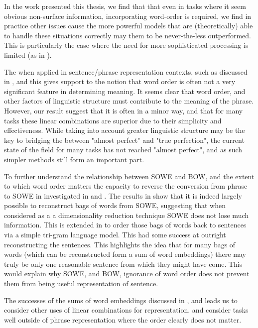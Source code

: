 \documentclass{book}
\begin{document}
In the work presented this thesis, 
we find that that even in tasks where it seem obvious non-surface information, incorporating word-order is required,
we find in practice other issues cause the more powerful models that are (theoretically) able to handle these situations correctly may them to be never-the-less outperformed.
This is particularly the case where the need for more sophisticated processing is limited (as in ).






The when applied in sentence/phrase representation contexts,
such as discussed in , and 
this gives support to the notion that word order is often not a very significant feature in determining meaning.
It seems clear that word order, and other factors of linguistic structure must contribute to the meaning of the phrase.
However, our result suggest that it is often in a minor way, and that for many tasks these linear combinations are superior due to their simplicity and effectiveness.
While taking into account greater linguistic structure may be the key to bridging the between "almost perfect" and "true perfection", the current state of the field for many tasks has not reached "almost perfect", and as such simpler methods still form an important part.

To further understand the relationship between SOWE and BOW, and the extent to which word order matters the capacity to reverse the conversion from phrase to SOWE in investigated in  and .
The results in  show that it is indeed largely possible to reconstruct bags of words from SOWE, suggesting that when considered as a a dimensionality reduction technique SOWE does not lose much information.
This is extended in  to order those bags of words back to sentences via a simple tri-gram language model.
This had some success at outright reconstructing the sentences.
This highlights the idea that for many  bags of words (which can be reconstructed form a sum of word embeddings) there may truly be only one reasonable sentence from which they might have come.
This would explain why SOWE, and BOW, ignorance of word order does not prevent them from being useful representation of sentence.


The successes of the sums of word embeddings discussed in , and  leads us to consider other uses of linear combinations for representation.
 and  consider tasks well outside of phrase representation where the order clearly does not matter.
\end{document}
